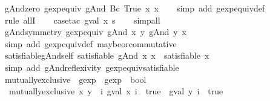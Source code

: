 \begin{isabellebody}
\isanewline
%
\endisadelimproof
\isanewline
{}\isamarkupfalse%
\ gAnd{\isacharunderscore}zero{\isacharcolon}\ {\isachardoublequoteopen}gexp{\isacharunderscore}equiv\ {\isacharparenleft}gAnd\ {\isacharparenleft}Bc\ True{\isacharparenright}\ x{\isacharparenright}\ x{\isachardoublequoteclose}\isanewline
%
\isadelimproof
\ \ %
\endisadelimproof
%
\isatagproof
{}\isamarkupfalse%
\ {\isacharparenleft}simp\ add{\isacharcolon}\ gexp{\isacharunderscore}equiv{\isacharunderscore}def{\isacharparenright}\isanewline
\ \ \isamarkupfalse%
\ {\isacharparenleft}rule\ allI{\isacharparenright}\isanewline
\ \ \isamarkupfalse%
\ {\isacharparenleft}case{\isacharunderscore}tac\ {\isachardoublequoteopen}gval\ x\ s{\isachardoublequoteclose}{\isacharparenright}\isanewline
\ \ \isamarkupfalse%
\ simp{\isacharunderscore}all%
\endisatagproof
{\isafoldproof}%
%
\isadelimproof
\isanewline
%
\endisadelimproof
\isanewline
{}\isamarkupfalse%
\ gAnd{\isacharunderscore}symmetry{\isacharcolon}\ {\isachardoublequoteopen}gexp{\isacharunderscore}equiv\ {\isacharparenleft}gAnd\ x\ y{\isacharparenright}\ {\isacharparenleft}gAnd\ y\ x{\isacharparenright}{\isachardoublequoteclose}\isanewline
%
\isadelimproof
\ \ %
\endisadelimproof
%
\isatagproof
{}\isamarkupfalse%
\ {\isacharparenleft}simp\ add{\isacharcolon}\ gexp{\isacharunderscore}equiv{\isacharunderscore}def\ maybe{\isacharunderscore}or{\isacharunderscore}commutative{\isacharparenright}%
\endisatagproof
{\isafoldproof}%
%
\isadelimproof
\isanewline
%
\endisadelimproof
\isanewline
{}\isamarkupfalse%
\ satisfiable{\isacharunderscore}gAnd{\isacharunderscore}self{\isacharcolon}\ {\isachardoublequoteopen}satisfiable\ {\isacharparenleft}gAnd\ x\ x{\isacharparenright}\ {\isacharequal}\ satisfiable\ x{\isachardoublequoteclose}\isanewline
%
\isadelimproof
\ \ %
\endisadelimproof
%
\isatagproof
{}\isamarkupfalse%
\ {\isacharparenleft}simp\ add{\isacharcolon}\ gAnd{\isacharunderscore}reflexivity\ gexp{\isacharunderscore}equiv{\isacharunderscore}satisfiable{\isacharparenright}%
\endisatagproof
{\isafoldproof}%
%
\isadelimproof
\isanewline
%
\endisadelimproof
\isanewline
{}\isamarkupfalse%
\ mutually{\isacharunderscore}exclusive\ {\isacharcolon}{\isacharcolon}\ {\isachardoublequoteopen}gexp\ {\isasymRightarrow}\ gexp\ {\isasymRightarrow}\ bool{\isachardoublequoteclose}\ \isanewline
\ \ {\isachardoublequoteopen}mutually{\isacharunderscore}exclusive\ x\ y\ {\isacharequal}\ {\isacharparenleft}{\isasymforall}i{\isachardot}\ {\isacharparenleft}gval\ x\ i\ {\isacharequal}\ true\ {\isasymlongrightarrow}\ gval\ y\ i\ {\isasymnoteq}\ true{\isacharparenright}\ {\isasymand}\isanewline

\end{isabellebody}
